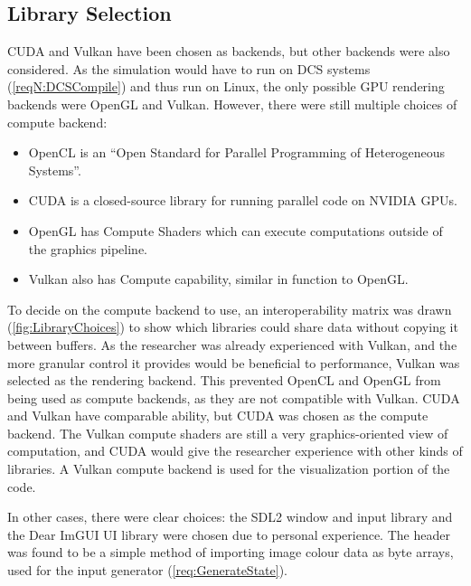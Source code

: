 \subsection{Library Selection}
\label{sec:LibrarySelection}

CUDA and Vulkan have been chosen as backends, but other backends were also considered.
As the simulation would have to run on DCS systems (\cref{reqN:DCSCompile}) and thus run on Linux, the only possible GPU rendering backends were OpenGL and Vulkan.
However, there were still multiple choices of compute backend:
\begin{itemize}
    \item OpenCL\cite{tool:OpenCL1.0PressRelease} is an ``Open Standard for Parallel Programming of Heterogeneous Systems''\cite{TheKhronosGroupOpenCLInc}.
    \item CUDA\cite{tool:CUDA} is a closed-source library for running parallel code on NVIDIA GPUs.
    \item OpenGL has Compute Shaders\cite{tool:OpenGLComputeShaderExt} which can execute computations outside of the graphics pipeline.
    \item Vulkan also has Compute capability\cite{TheKhronosGroupVulkanGuide}, similar in function to OpenGL.
\end{itemize}
To decide on the compute backend to use, an interoperability matrix was drawn (\cref{fig:LibraryChoices}) to show which libraries could share data without copying it between buffers.
As the researcher was already experienced with Vulkan, and the more granular control it provides would be beneficial to performance, Vulkan was selected as the rendering backend.
This prevented OpenCL and OpenGL from being used as compute backends, as they are not compatible with Vulkan.
CUDA and Vulkan have comparable ability, but CUDA was chosen as the compute backend.
The Vulkan compute shaders are still a very graphics-oriented view of computation, and CUDA would give the researcher experience with other kinds of libraries.
A Vulkan compute backend is used for the visualization portion of the code.


In other cases, there were clear choices: the SDL2\cite{SimpleHomepage} window and input library and the Dear ImGUI\cite{CornutDearImGui} UI library were chosen due to personal experience.
The  header was found to be a simple method of importing image colour data as byte arrays, used for the input generator (\cref{req:GenerateState}).

